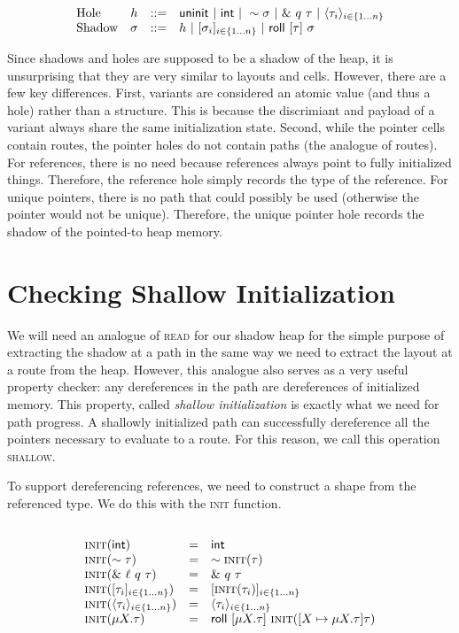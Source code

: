 \[
\begin{array}{lccl}
\textrm{Hole} & h & ::= & \mathsf{uninit} ~|~ \mathsf{int} ~|~ \sim{\sigma} 
				      ~|~ \&~{{q}~{\tau}} ~|~ \langle{{\tau}_{i}}\rangle_{{i} \in \{1 \ldots {n}\} } \\
\textrm{Shadow} & \sigma & ::= & h ~|~ [{{\sigma}_{i}}]_{{i} \in \{1 \ldots {n}\} } ~|~ \mathsf{roll}~[{\tau}]~{\sigma} \\
\end{array}
\]

Since shadows and holes are supposed to be a shadow of the heap,
it is unsurprising that they are very similar to layouts and cells.
However, there are a few key differences.
First, variants are considered an atomic value (and thus a hole) rather than
a structure. This is because the discrimiant and payload of a variant always
share the same initialization state.
Second, while the pointer cells contain routes, the pointer holes do not
contain paths (the analogue of routes).
For references, there is no need because references always point to fully initialized things.
Therefore, the reference hole simply records the type of the reference.
For unique pointers, there is no path that could possibly be used
(otherwise the pointer would not be unique).
Therefore, the unique pointer hole records the shadow of the pointed-to heap memory.

\section*{Checking Shallow Initialization}
We will need an analogue of \textsc{read} for our shadow heap for the
simple purpose of extracting the shadow at a path in the same way we
need to extract the layout at a route from the heap.
However, this analogue also serves as a very useful property checker:
any dereferences in the path are dereferences of initialized memory.
This property, called \emph{shallow initialization} is exactly what we need
for path progress. A shallowly initialized path can successfully dereference
all the pointers necessary to evaluate to a route.
For this reason, we call this operation \textsc{shallow}.

To support dereferencing references, we need to construct a shape from the referenced type.
We do this with the \textsc{init} function.

$$ $$


\[
\begin{array}{lcl}
\textsc{init}({\mathsf{int}}) &=& \mathsf{int} \\
\textsc{init}({\sim{\tau}}) &=& \sim{\textsc{init}({\tau})} \\
\textsc{init}({\&~{{\ell}~{q}~{\tau}}}) &=& \&~{{q}~{\tau}} \\
\textsc{init}({[{{\tau}_{i}}]_{{i} \in \{1 \ldots {n}\} }}) &=& [\textsc{init}({\tau_i})]_{i \in \{1\ldots n\}} \\
\textsc{init}({\langle{{\tau}_{i}}\rangle_{{i} \in \{1 \ldots {n}\} }}) &=& \langle{{\tau}_{i}}\rangle_{{i} \in \{1 \ldots {n}\} } \\
\textsc{init}({\mu {X}.{\tau}}) &=& \mathsf{roll}~[{\mu {X}.{\tau}}]~{\textsc{init}({[{X} \mapsto {\mu {X}.{\tau}}] {\tau}})} \\
\end{array}
\]

